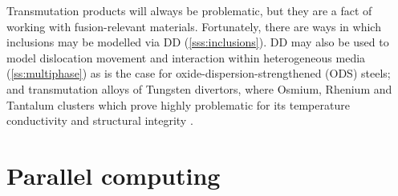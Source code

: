 Transmutation products will always be problematic, but they are a fact of working with fusion-relevant materials. Fortunately, there are ways in which inclusions may be modelled via DD (\cref{sss:inclusions}). DD may also be used to model dislocation movement and interaction within heterogeneous media (\cref{ss:multiphase}) as is the case for oxide-dispersion-strengthened (ODS) steels; and transmutation alloys of Tungsten divertors, where Osmium, Rhenium and Tantalum clusters which prove highly problematic for its temperature conductivity and structural integrity \cite{w_cluster1, nirrprop, nirpropmic, nirrmic, ionirrmic, ionirrprop, ionirrprop2}.

\section{Parallel computing}
\label{s:parallel_comp}

